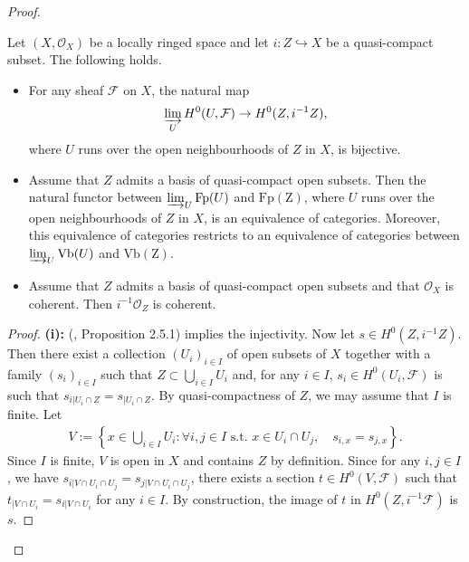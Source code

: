 \documentclass [11pt,reqno]{amsart}
\newcommand{\1}{\mathmybb{1}}
\def\cF{{\mathcal{F}}}
\def\cO{{\mathcal{O}}}
\begin{document}
\begin{proof}
\begin{claim}
\label{claim:coherent_sheaves_qc_subspace}
Let $(X,\cO_{X})$ be a locally ringed space and let $i:Z\hookrightarrow X$ be a quasi-compact subset. The following holds.
\begin{itemize}
	\item[(i)] For any sheaf $\cF$ on $X$, the natural map
	\begin{align*}
	\displaystyle\varinjlim_{U} H^{0}(U,\cF) \to H^{0}(Z,i^{-1}Z),
	\end{align*}
	where $U$ runs over the open neighbourhoods of $Z$ in $X$, is bijective.
	\item[(ii)] Assume that $Z$ admits a basis of quasi-compact open subsets. Then the natural functor between $\varinjlim_{U}\mathrm{Fp}(U)$ and $\mathrm{Fp(Z)}$, where $U$ runs over the open neighbourhoods of $Z$ in $X$, is an equivalence of categories. Moreover, this equivalence of categories restricts to an equivalence of categories between $\varinjlim_{U}\mathrm{Vb}(U)$ and $\mathrm{Vb(Z)}$.
	\item[(iii)] Assume that $Z$ admits a basis of quasi-compact open subsets and that $\cO_{X}$ is coherent. Then $i^{-1}\cO_{Z}$ is coherent. 
\end{itemize}
\end{claim}

\begin{proof}
\textbf{(i):} (\cite{KS90}, Proposition 2.5.1) implies the injectivity. Now let $s\in H^{0}(Z,i^{-1}Z)$. Then there exist a collection $(U_{i})_{i\in I}$ of open subsets of $X$ together with a family $(s_{i})_{i\in I}$ such that $Z\subset\bigcup_{i\in I}U_{i}$ and, for any $i\in I$, $s_{i}\in H^{0}(U_{i},\cF)$ is such that $s_{i|U_{i}\cap Z}=s_{|U_{i}\cap Z}$. By quasi-compactness of $Z$, we may assume that $I$ is finite. Let 
\begin{align*}
V:=\left\{x\in \displaystyle\bigcup_{i\in I}U_{i} : \forall i,j\in I \text{ s.t. }x\in U_{i}\cap U_{j}, \quad s_{i,x}=s_{j,x}\right\}.
\end{align*}
Since $I$ is finite, $V$ is open in $X$ and contains $Z$ by definition. Since for any $i,j\in I$, we have $s_{i|V\cap U_{i}\cap U_{j}}=s_{j|V\cap U_{i}\cap U_{j}}$, there exists a section $t\in H^{0}(V,\cF)$ such that $t_{|V\cap U_{i}}=s_{i|V\cap U_{i}}$ for any $i\in I$. By construction, the image of $t$ in $H^{0}(Z,i^{-1}\cF)$ is $s$. 


\end{proof}
\end{proof}
\end{document}
